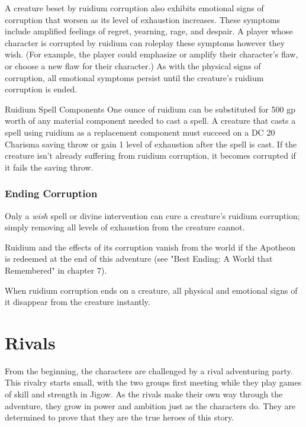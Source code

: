 \documentclass[10pt,a4paper,twoside,bg=print,twocolumn,openany,nodeprecatedcode]{dndbook}
\begin{document}
A creature beset by ruidium corruption also exhibits emotional signs of corruption that worsen as its level of exhaustion increases. These symptoms include amplified feelings of regret, yearning, rage, and despair. A player whose character is corrupted by ruidium can roleplay these symptoms however they wish. (For example, the player could emphasize or amplify their character's flaw, or choose a new flaw for their character.) As with the physical signs of corruption, all emotional symptoms persist until the creature's ruidium corruption is ended.

\begin{DndSidebar}[float=!b]{Ruidium Spell Components}
One ounce of ruidium can be substituted for 500 gp worth of any material component needed to cast a spell. A creature that casts a spell using ruidium as a replacement component must succeed on a DC 20 Charisma saving throw or gain 1 level of exhaustion after the spell is cast. If the creature isn't already suffering from ruidium corruption, it becomes corrupted if it fails the saving throw.



\end{DndSidebar}

\subsubsection{Ending Corruption}
Only a \textit{wish} spell or divine intervention can cure a creature's ruidium corruption; simply removing all levels of exhaustion from the creature cannot.

Ruidium and the effects of its corruption vanish from the world if the Apotheon is redeemed at the end of this adventure (see "Best Ending: A World that Remembered" in chapter 7).

When ruidium corruption ends on a creature, all physical and emotional signs of it disappear from the creature instantly.

\section{Rivals}
From the beginning, the characters are challenged by a rival adventuring party. This rivalry starts small, with the two groups first meeting while they play games of skill and strength in Jigow. As the rivals make their own way through the adventure, they grow in power and ambition just as the characters do. They are determined to prove that they are the true heroes of this story.
\end{document}
